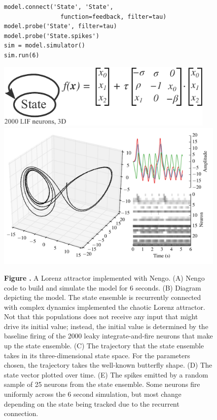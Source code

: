 \documentclass{frontiersSCNS}
\begin{document}
\begin{figure}
\begin{center}
\begin{minipage}{0.43\textwidth}
\begin{lstlisting}[basicstyle={\footnotesize\ttfamily}]
model.connect('State', 'State',
                function=feedback, filter=tau)
model.probe('State', filter=tau)
model.probe('State.spikes')
sim = model.simulator()
sim.run(6)
    \end{lstlisting}
  \end{minipage}
  \begin{minipage}{0.55\textwidth}
    \includegraphics[width=0.95\textwidth]{lorenz}
    \includegraphics[width=\textwidth]{lorenz_res}
  \end{minipage}
\end{center}
 \textbf{\label{fig:lorenz} Figure .}{
   A Lorenz attractor implemented with Nengo.
   (A) Nengo code to build and simulate the model
   for 6 seconds.
   (B) Diagram depicting the model. The state ensemble
   is recurrently connected with complex dynamics
   implemented the chaotic Lorenz attractor.
   Not that this populations does not receive
   any input that might drive its initial value;
   instead, the initial value is determined by
   the baseline firing of the 2000 leaky integrate-and-fire
   neurons that make up the state ensemble.
   (C) The trajectory that the state ensemble takes
   in its three-dimensional state space.
   For the parameters chosen, the trajectory takes
   the well-known butterfly shape.
   (D) The state vector plotted over time.
   (E) The spikes emitted by a random sample of 25
   neurons from the state ensemble.
   Some neurons fire uniformly across the 6 second simulation,
   but most change depending on the state being tracked
   due to the recurrent connection.}
\end{figure}
\end{document}
